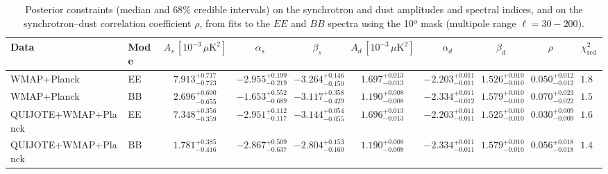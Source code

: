 \begin{table}[h]
\centering
\scriptsize
\setlength{\tabcolsep}{4pt}
\caption{Posterior constraints (median and $68\%$ credible intervals) on the synchrotron and dust amplitudes and spectral indices, and on the synchrotron--dust correlation coefficient $\rho$, from fits to the $EE$ and $BB$ spectra using the 10º mask (multipole range $\ell=30-200$).}
\label{tab:fit_no_QQ_autos_ell30-200}
\begin{tabular}{llcccccccc}
\toprule
Data & Mode & $A_s\,[10^{-3}\,\mu\mathrm{K}^2]$ & $\alpha_s$ & $\beta_s$ & $A_d\,[10^{-3}\,\mu\mathrm{K}^2]$ & $\alpha_d$ & $\beta_d$ & $\rho$ & $\chi^2_\mathrm{red}$ \\
\midrule
WMAP+Planck & EE & $7.913^{+0.717}_{-0.723}$ & $-2.955^{+0.199}_{-0.219}$ & $-3.264^{+0.146}_{-0.150}$ & $1.697^{+0.013}_{-0.013}$ & $-2.203^{+0.011}_{-0.011}$ & $1.526^{+0.010}_{-0.010}$ & $0.050^{+0.012}_{-0.012}$ & $1.81$ \\
WMAP+Planck & BB & $2.696^{+0.600}_{-0.655}$ & $-1.653^{+0.552}_{-0.689}$ & $-3.117^{+0.358}_{-0.429}$ & $1.190^{+0.008}_{-0.008}$ & $-2.334^{+0.011}_{-0.012}$ & $1.579^{+0.010}_{-0.010}$ & $0.070^{+0.023}_{-0.022}$ & $1.54$ \\
QUIJOTE+WMAP+Planck & EE & $7.348^{+0.356}_{-0.359}$ & $-2.951^{+0.112}_{-0.117}$ & $-3.144^{+0.054}_{-0.055}$ & $1.696^{+0.013}_{-0.013}$ & $-2.203^{+0.011}_{-0.011}$ & $1.525^{+0.010}_{-0.010}$ & $0.030^{+0.009}_{-0.009}$ & $1.69$ \\
QUIJOTE+WMAP+Planck & BB & $1.781^{+0.385}_{-0.416}$ & $-2.867^{+0.509}_{-0.637}$ & $-2.804^{+0.153}_{-0.160}$ & $1.190^{+0.008}_{-0.008}$ & $-2.334^{+0.011}_{-0.011}$ & $1.579^{+0.010}_{-0.010}$ & $0.056^{+0.018}_{-0.018}$ & $1.47$ \\
\bottomrule
\end{tabular}
\end{table}